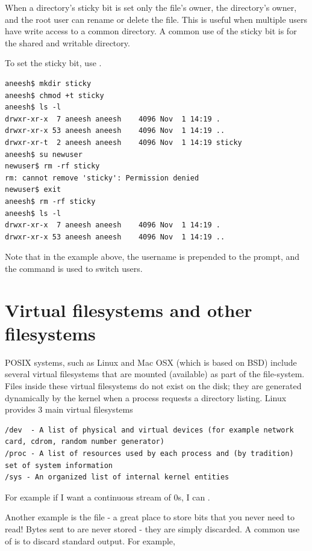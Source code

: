 When a directory's sticky bit is set only the file's owner, the directory's owner, and the root user can rename or delete the file. This is useful when multiple users have write access to a common directory. A common use of the sticky bit is for the shared and writable  directory.

To set the sticky bit, use .

\begin{lstlisting}
aneesh$ mkdir sticky
aneesh$ chmod +t sticky 
aneesh$ ls -l
drwxr-xr-x  7 aneesh aneesh    4096 Nov  1 14:19 .
drwxr-xr-x 53 aneesh aneesh    4096 Nov  1 14:19 ..
drwxr-xr-t  2 aneesh aneesh    4096 Nov  1 14:19 sticky
aneesh$ su newuser
newuser$ rm -rf sticky
rm: cannot remove 'sticky': Permission denied
newuser$ exit
aneesh$ rm -rf sticky
aneesh$ ls -l
drwxr-xr-x  7 aneesh aneesh    4096 Nov  1 14:19 .
drwxr-xr-x 53 aneesh aneesh    4096 Nov  1 14:19 ..
\end{lstlisting}

Note that in the example above, the username is prepended to the prompt, and the command  is used to switch users.

\section{Virtual filesystems and other filesystems}

POSIX systems, such as Linux and Mac OSX (which is based on BSD) include several virtual filesystems that are mounted (available) as part of the file-system. Files inside these virtual filesystems do not exist on the disk; they are generated dynamically by the kernel when a process requests a directory listing. Linux provides 3 main virtual filesystems

\begin{lstlisting}
/dev  - A list of physical and virtual devices (for example network card, cdrom, random number generator)
/proc - A list of resources used by each process and (by tradition) set of system information
/sys - An organized list of internal kernel entities
\end{lstlisting}

For example if I want a continuous stream of 0s, I can .

Another example is the file  - a great place to store bits that you never need to read! Bytes sent to  are never stored - they are simply discarded. A common use of  is to discard standard output. For example,

